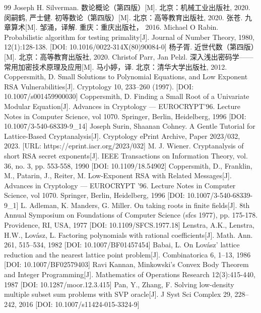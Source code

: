 \documentclass{book}
\numberwithin{equation}{subsubsection}
\begin{document}
\begin{thebibliography}{99}
     Joseph H. Silverman. 数论概论（第四版）[M]. 北京：机械工业出版社, 2020.
     闵嗣鹤, 严士健. 初等数论（第四版）[M]. 北京：高等教育出版社, 2020.  
     张苍. 九章算术[M]. 邹涌，译解. 重庆：重庆出版社， 2016.
     Michael O Rabin. Probabilistic algorithm for testing primality[J]. Journal of Number Theory, 1980, 12(1):128-138. [DOI: 10.1016/0022-314X(80)90084-0]
     杨子胥. 近世代数（第四版）[M]. 北京：高等教育出版社, 2020.
     Christof Parr, Jan Pelzl. 深入浅出密码学——常用加密技术原理及应用[M]. 马小婷，译. 北京：清华大学出版社, 2012.
     Coppersmith, D. Small Solutions to Polynomial Equations, and Low Exponent RSA Vulnerabilities[J]. Cryptology 10, 233–260 (1997). [DOI: 10.1007/s001459900030]
     Coppersmith, D. Finding a Small Root of a Univariate Modular Equation[J]. Advances in Cryptology --- EUROCRYPT’96. Lecture Notes in Computer Science, vol 1070. Springer, Berlin, Heidelberg, 1996 [DOI: 10.1007/3-540-68339-9\_14]
     Joseph Surin, Shaanan Cohney. A Gentle Tutorial for Lattice-Based Cryptanalysis[J]. Cryptology {ePrint} Archive, Paper 2023/032, 2023. [URL: https://eprint.iacr.org/2023/032]
     M. J. Wiener. Cryptanalysis of short RSA secret exponents[J]. IEEE Transactions on Information Theory, vol. 36, no. 3, pp. 553-558, 1990 [DOI: 10.1109/18.54902]
     Coppersmith, D., Franklin, M., Patarin, J., Reiter, M. Low-Exponent RSA with Related Messages[J]. Advances in Cryptology --- EUROCRYPT '96. Lecture Notes in Computer Science, vol 1070. Springer, Berlin, Heidelberg, 1996 [DOI: 10.1007/3-540-68339-9\_1]
     L. Adleman, K. Manders, G. Miller. On taking roots in finite fields[J]. 8th Annual Symposium on Foundations of Computer Science (sfcs 1977), pp. 175-178. Providence, RI, USA, 1977 [DOI: 10.1109/SFCS.1977.18]
     Lenstra, A.K., Lenstra, H.W., Lovász, L. Factoring polynomials with rational coefficients[J]. Math. Ann. 261, 515–534, 1982 [DOI: 10.1007/BF01457454]
     Babai, L. On Lovász’ lattice reduction and the nearest lattice point problem[J]. Combinatorica 6, 1–13, 1986 [DOI: 10.1007/BF02579403]
     Ravi Kannan, Minkowski's Convex Body Theorem and Integer Programming[J]. Mathematics of Operations Research 12(3):415-440, 1987 [DOI: 10.1287/moor.12.3.415]
     Pan, Y., Zhang, F. Solving low-density multiple subset sum problems with SVP oracle[J].  J Syst Sci Complex 29, 228–242, 2016 [DOI: 10.1007/s11424-015-3324-9]

\end{thebibliography}
\end{document}
